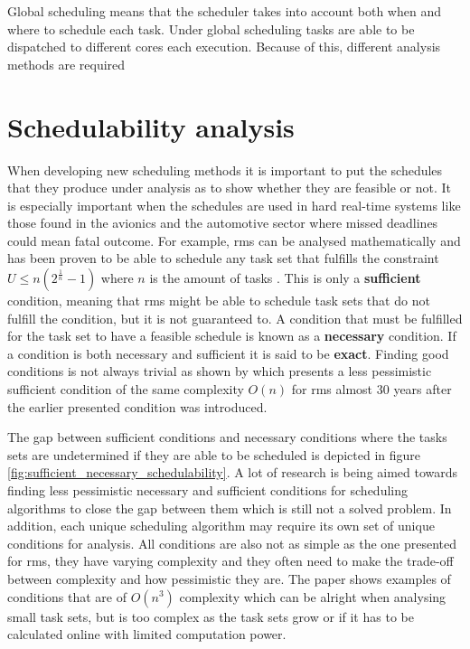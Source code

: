 \documentclass{kththesis}
\begin{document}
Global scheduling means that the scheduler takes into account both when and where to schedule each
task. Under global scheduling tasks are able to be dispatched to different cores each execution.
Because of this, different analysis methods are required 


\section{Schedulability analysis}

When developing new scheduling methods it is important to put the schedules that they produce under
analysis as to show whether they are feasible or not. It is especially important when the schedules
are used in hard real-time systems like those found in the avionics and the automotive sector where
missed deadlines could mean fatal outcome. For example, \acrshort{rms} can be analysed
mathematically and has been proven to be able to schedule any task set that fulfills the constraint
$ U \le n(2^{\frac{1}{n}}-1) $ where $ n $ is the amount of tasks \parencite{liu_scheduling_1973}.
This is only a \textbf{sufficient} condition, meaning that \acrshort{rms} might be able to schedule
task sets that do not fulfill the condition, but it is not guaranteed to. A condition that must be
fulfilled for the task set to have a feasible schedule is known as a \textbf{necessary} condition.
If a condition is both necessary and sufficient it is said to be \textbf{exact}. Finding good
conditions is not always trivial as shown by \parencite{bini_hyperbolic_2001} which presents a less
pessimistic sufficient condition of the same complexity $ O(n) $ for \acrshort{rms} almost 30
years after the earlier presented condition was introduced. 

The gap between sufficient conditions and necessary conditions where the tasks sets are undetermined
if they are able to be scheduled is depicted in figure
\ref{fig:sufficient_necessary_schedulability}. A lot of research is being aimed towards finding less
pessimistic necessary and sufficient conditions for scheduling algorithms to close the gap between
them which is still not a solved problem. In addition, each unique scheduling algorithm may require
its own set of unique conditions for analysis. All conditions are also not as simple as the one
presented for \acrshort{rms}, they have varying complexity and they often need to make the trade-off
between complexity and how pessimistic they are. The paper \parencite{bertogna_tests_2011} shows
examples of conditions that are of $ O(n^3) $ complexity which can be alright when analysing small
task sets, but is too complex as the task sets grow or if it has to be calculated online with
limited computation power.
\end{document}
